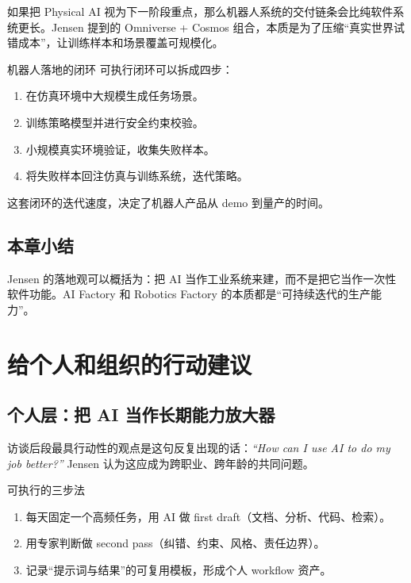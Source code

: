 \documentclass[a4paper]{article}
\begin{document}
如果把 Physical AI 视为下一阶段重点，那么机器人系统的交付链条会比纯软件系统更长。Jensen 提到的 Omniverse + Cosmos 组合，本质是为了压缩“真实世界试错成本”，让训练样本和场景覆盖可规模化。

\begin{importantbox}{机器人落地的闭环}
可执行闭环可以拆成四步：
\begin{enumerate}
    \item 在仿真环境中大规模生成任务场景。
    \item 训练策略模型并进行安全约束校验。
    \item 小规模真实环境验证，收集失败样本。
    \item 将失败样本回注仿真与训练系统，迭代策略。
\end{enumerate}
这套闭环的迭代速度，决定了机器人产品从 demo 到量产的时间。
\end{importantbox}

\subsection{本章小结}
Jensen 的落地观可以概括为：把 AI 当作工业系统来建，而不是把它当作一次性软件功能。AI Factory 和 Robotics Factory 的本质都是“可持续迭代的生产能力”。

\section{给个人和组织的行动建议}

\subsection{个人层：把 AI 当作长期能力放大器}

访谈后段最具行动性的观点是这句反复出现的话：\textit{``How can I use AI to do my job better?''} Jensen 认为这应成为跨职业、跨年龄的共同问题。

\begin{knowledgebox}{可执行的三步法}
\begin{enumerate}
    \item 每天固定一个高频任务，用 AI 做 first draft（文档、分析、代码、检索）。
    \item 用专家判断做 second pass（纠错、约束、风格、责任边界）。
    \item 记录“提示词与结果”的可复用模板，形成个人 workflow 资产。
\end{enumerate}
\end{knowledgebox}
\end{document}
